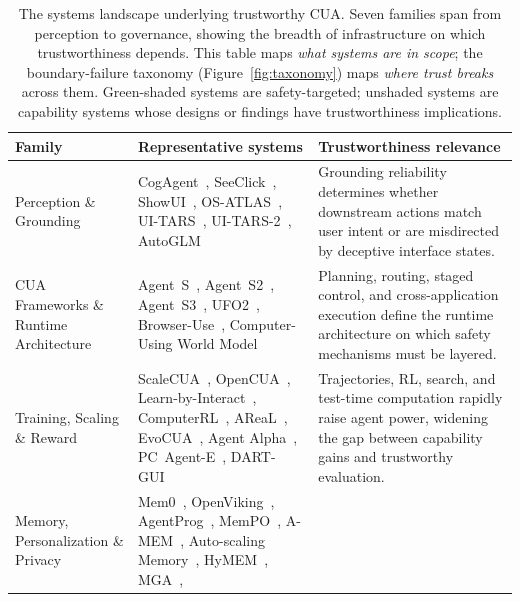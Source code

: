 \begin{table}[!ht]
\caption{The systems landscape underlying trustworthy CUA. Seven families span from perception to governance, showing the breadth of infrastructure on which trustworthiness depends. This table maps \emph{what systems are in scope}; the boundary-failure taxonomy (Figure~\ref{fig:taxonomy}) maps \emph{where trust breaks} across them. \colorbox{evSaf!15}{Green-shaded} systems are safety-targeted; unshaded systems are capability systems whose designs or findings have trustworthiness implications.}
\label{tab:cua-system-families}
\centering
\scriptsize
\setlength{\tabcolsep}{3pt}
\renewcommand{\arraystretch}{1.15}
\begin{tabularx}{\textwidth}{@{}L{2.5cm} X L{3.8cm}@{}}
\toprule
\textbf{Family} & \textbf{Representative systems} & \textbf{Trustworthiness relevance} \\
\midrule
Perception \& Grounding &
CogAgent~\cite{cogagent2023},
SeeClick~\cite{seeclick2024},
ShowUI~\cite{showui2024},
OS-ATLAS~\cite{osatlas2024},
UI-TARS~\cite{uitars2025},
UI-TARS-2~\cite{uitars22025},
AutoGLM~\cite{autoglm2024} &
Grounding reliability determines whether downstream actions match user intent or are misdirected by deceptive interface states. \\
\midrule
CUA Frameworks \& Runtime Architecture &
Agent~S~\cite{agents2024},
Agent~S2~\cite{agents22025},
Agent~S3~\cite{agents32026},
UFO2~\cite{ufo2025},
Browser-Use~\cite{browseruse2025},
Computer-Using World Model~\cite{cuwm2026} &
Planning, routing, staged control, and cross-application execution define the runtime architecture on which safety mechanisms must be layered. \\
\midrule
Training, Scaling \& Reward &
ScaleCUA~\cite{scalecua2025},
OpenCUA~\cite{opencua2025},
Learn-by-Interact~\cite{learnbyinteract2025},
ComputerRL~\cite{computerrl2025},
AReaL~\cite{areal2025},
EvoCUA~\cite{evocua2026},
Agent Alpha~\cite{agentalpha2026},
PC~Agent-E~\cite{pcaegente2025},
DART-GUI~\cite{dartgui2025} &
Trajectories, RL, search, and test-time computation rapidly raise agent power, widening the gap between capability gains and trustworthy evaluation. \\
\midrule
Memory, Personalization \& Privacy &
Mem0~\cite{mem02024},
OpenViking~\cite{openviking2025},
AgentProg~\cite{agentprog2025},
MemPO~\cite{mempo2026},
A-MEM~\cite{amem2025},
Auto-scaling Memory~\cite{autoscalememory2025},
HyMEM~\cite{hymem2026},
MGA~\cite{mga2025},

\end{tabularx}
\end{table}
